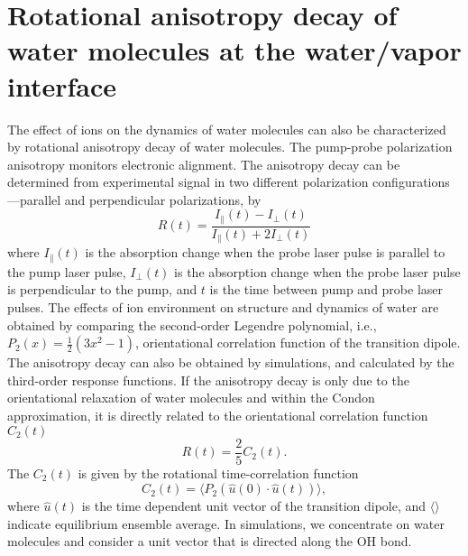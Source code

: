 \section{Rotational anisotropy decay of water molecules at the water/vapor interface}\label{RAD}
The effect of ions on the dynamics of water molecules can also be characterized by rotational anisotropy decay of water molecules.
The pump-probe polarization anisotropy monitors electronic alignment.\cite{Jonas96,Farrow08} 
The anisotropy decay can be determined from experimental signal in two different polarization configurations---parallel and perpendicular polarizations, by\cite{Szabo1984,Fleming86} 
\begin{equation}
   R(t)=\frac{I_{\parallel}(t)-I_{\perp}(t)}{I_{\parallel}(t)+2I_{\perp}(t)}
\label{eq:ad}
\end{equation}
where $I_{\parallel}(t)$ is the absorption change when the probe laser pulse is parallel to the pump laser pulse,
$I_{\perp}(t)$ is the absorption change when the probe laser pulse is perpendicular to the pump, 
and $t$ is the time between pump and probe laser pulses. 
The effects of ion environment on structure and dynamics of water are obtained by comparing the second-order Legendre polynomial, 
i.e., $P_2(x)=\frac{1}{2}(3x^2-1)$,  orientational correlation function of the transition dipole.
The anisotropy decay can also be obtained by simulations, and calculated by the third-order response functions. \cite{Jansen10,Jansen06}
If the anisotropy decay is only due to the orientational relaxation of water molecules and within the Condon approximation\cite{Schmidt2005}, 
it is directly related to the orientational correlation function $C_2(t)$\cite{Tokmakoff1996,Rezus2006,Yagasaki2009,Bakker2010}
\begin{equation}
R(t)=\frac{2}{5}C_2(t).
\label{eq:tcf2}
\end{equation}
The $C_2(t)$ is given by the rotational time-correlation function 
\begin{equation}
C_2(t)=\langle P_2(\hat{u}(0)\cdot\hat{u}(t)) \rangle,
\label{eq:tcf2}
\end{equation}
where $\hat{u}(t)$ is the time dependent unit vector of the transition dipole, 
and $\langle \rangle$ indicate equilibrium ensemble average.\cite{Corcelli05,LinYS2010} %
In simulations, we concentrate on water molecules and consider a unit vector that is 
directed along the OH bond. %

